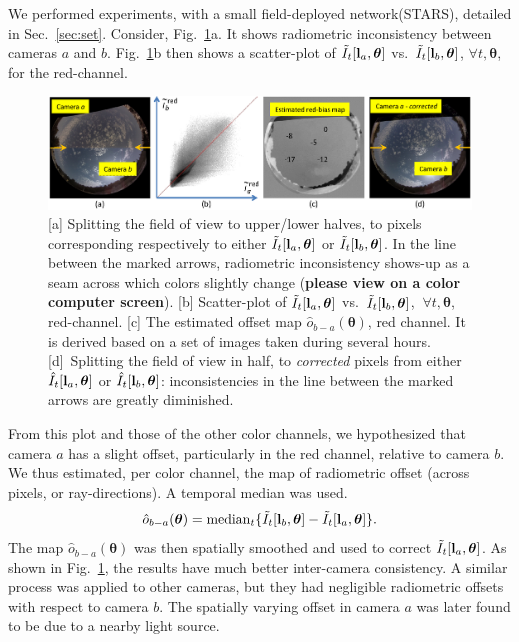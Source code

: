 \documentclass[runningheads]{llncs}
\begin{document}
We performed experiments, with a small field-deployed network(STARS), detailed in Sec.~\ref{sec:set}. Consider, Fig.~\ref{fig:calibration}a. It shows radiometric inconsistency between cameras $a$ and $b$. Fig.~\ref{fig:calibration}b then shows a scatter-plot of
$\tilde I_t[{\bf l}_a,{\bm \theta}]$ vs.~$\tilde I_t[{\bf l}_{b},{\bm \theta}]$, $\forall t,{\bm \theta}$, for the red-channel.
\begin{figure}[t!]
\begin{center}
   \includegraphics[width=\linewidth]{figures/bias4.eps}
\end{center}
   \vspace{-0.6cm}
   \caption{[a] Splitting the field of view to upper/lower halves, to pixels corresponding
   respectively to either $\tilde I_t[{\bf l}_a,{\bm \theta}]$  or $\tilde I_t[{\bf l}_{b},{\bm \theta}]$. In the line between the marked arrows, radiometric inconsistency shows-up as a seam across which colors slightly change ({\bf please view on a color computer screen}). [b] Scatter-plot of
   $\tilde I_t[{\bf l}_a,{\bm \theta}]$ vs.~$\tilde I_t[{\bf l}_{b},{\bm \theta}]$, $~\forall t,{\bm \theta}$, red-channel. [c] The estimated offset map ${\hat o}_{b-a}({\bm \theta})$, red channel. It is derived based on a set of images taken during several hours.
   [d]~Splitting the field of view in half, to {\em corrected} pixels from either
   $\hat I_t[{\bf l}_a,{\bm \theta}]$  or $\hat I_t[{\bf l}_{b},{\bm \theta}]$: inconsistencies in the line between the marked arrows are greatly
   diminished.
   }
\label{fig:calibration}
\end{figure}
From this plot and those of the other color channels, we hypothesized that camera $a$ has a slight offset, particularly in the red channel, relative to camera $b$. We thus estimated, per color channel, the map of radiometric offset (across pixels, or ray-directions). A temporal median was used.
\begin{equation}
 {\hat o}_{b-a}({\bm \theta})=
  {\rm median}_{t} \{\tilde I_t[{\bf l}_b,{\bm \theta}]-\tilde I_t[{\bf l}_a,{\bm \theta}]\}.
 \label{eq:hato}
\end{equation}
The map ${\hat o}_{b-a}({\bm \theta})$ was then spatially smoothed and used to correct $\tilde I_t[{\bf l}_a,{\bm \theta}]$. As shown in Fig.~\ref{fig:calibration}, the results have much better inter-camera consistency. A similar process was applied to other cameras, but they had negligible radiometric offsets with respect to camera $b$. The spatially varying offset in camera $a$ was later found to be due to a nearby light source.
\end{document}
